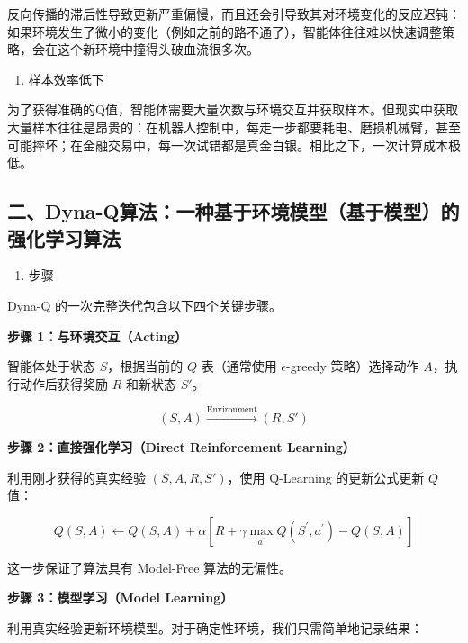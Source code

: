 反向传播的滞后性导致更新严重偏慢，而且还会引导致其对环境变化的反应迟钝：如果环境发生了微小的变化（例如之前的路不通了），智能体往往难以快速调整策略，会在这个新环境中撞得头破血流很多次。

\begin{enumerate}
\def\labelenumi{\arabic{enumi}.}
\setcounter{enumi}{1}
\tightlist
\item
  样本效率低下
\end{enumerate}

为了获得准确的Q值，智能体需要大量次数与环境交互并获取样本。但现实中获取大量样本往往是昂贵的：在机器人控制中，每走一步都要耗电、磨损机械臂，甚至可能摔坏；在金融交易中，每一次试错都是真金白银。相比之下，一次计算成本极低。

\hypertarget{ux4e8cdyna-qux7b97ux6cd5ux4e00ux79cdux57faux4e8eux73afux5883ux6a21ux578bux57faux4e8eux6a21ux578bux7684ux5f3aux5316ux5b66ux4e60ux7b97ux6cd5}{%
\subsection{二、Dyna-Q算法：一种基于环境模型（基于模型）的强化学习算法}\label{ux4e8cdyna-qux7b97ux6cd5ux4e00ux79cdux57faux4e8eux73afux5883ux6a21ux578bux57faux4e8eux6a21ux578bux7684ux5f3aux5316ux5b66ux4e60ux7b97ux6cd5}}

\begin{enumerate}
\def\labelenumi{\arabic{enumi}.}
\tightlist
\item
  步骤
\end{enumerate}

Dyna-Q 的一次完整迭代包含以下四个关键步骤。

\textbf{步骤 1：与环境交互（Acting）}

智能体处于状态 \(S\)，根据当前的 \(Q\) 表（通常使用 \(\epsilon\)-greedy 策略）选择动作 \(A\)，执行动作后获得奖励 \(R\) 和新状态 \(S'\)。

\[
(S,A)\xrightarrow{\text{Environment}}(R,S')
\]

\textbf{步骤 2：直接强化学习（Direct Reinforcement Learning）}

利用刚才获得的真实经验 \((S,A,R,S')\)，使用 Q-Learning 的更新公式更新 \(Q\) 值：

\[
Q(S,A)\leftarrow Q(S,A)+\alpha[R+\gamma\max_{a^{\prime}}Q(S^{\prime},a^{\prime})-Q(S,A)]
\]

这一步保证了算法具有 Model-Free 算法的无偏性。

\textbf{步骤 3：模型学习（Model Learning）}

利用真实经验更新环境模型。对于确定性环境，我们只需简单地记录结果：

